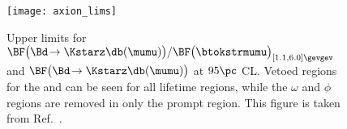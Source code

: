 \begin{figure}
  \begin{center}
    \texttt{[image: axion\_lims]}
    \caption[Projected sensitivity in an inflaton search]
    {
      Upper limits for
      $\BF\big(\Bd\!\to\Kstarz\db(\mumu)\big) / \BF\big(\btokstrmumu\big)_{[1.1,6.0]\gevgev}$
      and $\BF\big(\Bd\!\to\Kstarz\db(\mumu)\big)$ at $95\pc$ CL.
      Vetoed regions for the \jpsi and \psitwos can be seen for all lifetime regions, while the
      $\omega$ and $\phi$ regions are removed in only the prompt region.
      This figure is taken from Ref.~\protect\cite{LHCb-PAPER-2015-036}.
    }
    \label{fig:db:excl:infl}
  \end{center}
\end{figure}








